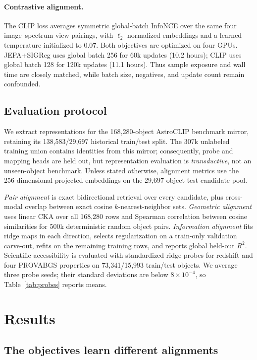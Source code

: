 \documentclass{article}
\begin{document}
\paragraph{Contrastive alignment.}
The CLIP loss averages symmetric global-batch InfoNCE over the same four image--spectrum view pairings, with $\ell_2$-normalized embeddings and a learned temperature initialized to 0.07.
Both objectives are optimized on four GPUs.
JEPA+SIGReg uses global batch 256 for 60k updates (10.2 hours); CLIP uses global batch 128 for 120k updates (11.1 hours).
Thus sample exposure and wall time are closely matched, while batch size, negatives, and update count remain confounded.

\subsection{Evaluation protocol}

We extract representations for the 168,280-object AstroCLIP benchmark mirror, retaining its 138,583/29,697 historical train/test split.
The 307k unlabeled training union contains identities from this mirror; consequently, probe and mapping heads are held out, but representation evaluation is \emph{transductive}, not an unseen-object benchmark.
Unless stated otherwise, alignment metrics use the 256-dimensional projected embeddings on the 29,697-object test candidate pool.

\emph{Pair alignment} is exact bidirectional retrieval over every candidate, plus cross-modal overlap between exact cosine $k$-nearest-neighbor sets.
\emph{Geometric alignment} uses linear CKA \citep{kornblith2019cka} over all 168,280 rows and Spearman correlation between cosine similarities for 500k deterministic random object pairs.
\emph{Information alignment} fits ridge maps in each direction, selects regularization on a train-only validation carve-out, refits on the remaining training rows, and reports global held-out $R^2$.
Scientific accessibility is evaluated with standardized ridge probes for redshift and four PROVABGS properties \citep{hahn2023provabgs} on 73,341/15,993 train/test objects.
We average three probe seeds; their standard deviations are below $8\times10^{-4}$, so Table~\ref{tab:probes} reports means.

\section{Results}

\subsection{The objectives learn different alignments}
\label{sec:alignment}
\end{document}
